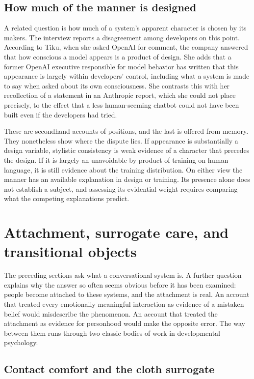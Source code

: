 \documentclass[11pt]{article}
\begin{document}
\subsection{How much of the manner is designed}

A related question is how much of a system's apparent character is chosen by its makers. The interview reports a disagreement among developers on this point. According to Tiku, when she asked OpenAI for comment, the company answered that how conscious a model appears is a product of design. She adds that a former OpenAI executive responsible for model behavior has written that this appearance is largely within developers' control, including what a system is made to say when asked about its own consciousness. She contrasts this with her recollection of a statement in an Anthropic report, which she could not place precisely, to the effect that a less human-seeming chatbot could not have been built even if the developers had tried.

These are secondhand accounts of positions, and the last is offered from memory. They nonetheless show where the dispute lies. If appearance is substantially a design variable, stylistic consistency is weak evidence of a character that precedes the design. If it is largely an unavoidable by-product of training on human language, it is still evidence about the training distribution. On either view the manner has an available explanation in design or training. Its presence alone does not establish a subject, and assessing its evidential weight requires comparing what the competing explanations predict.

\section{Attachment, surrogate care, and transitional objects}

The preceding sections ask what a conversational system is. A further question explains why the answer so often seems obvious before it has been examined: people become attached to these systems, and the attachment is real. An account that treated every emotionally meaningful interaction as evidence of a mistaken belief would misdescribe the phenomenon. An account that treated the attachment as evidence for personhood would make the opposite error. The way between them runs through two classic bodies of work in developmental psychology.

\subsection{Contact comfort and the cloth surrogate}
\end{document}
